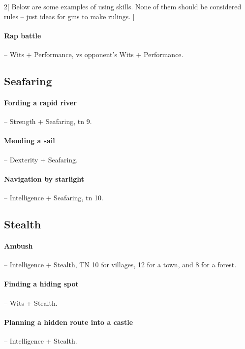 \begin{multicols}{2}[
  Below are some examples of using skills.
  None of them should be considered rules -- just ideas for \glspl{gm} to make rulings.
]
\paragraph{Rap battle} -- Wits + Performance, vs opponent's Wits + Performance.

\subsection{Seafaring}

\paragraph{Fording a rapid river} -- Strength + Seafaring, \gls{tn} 9.

\paragraph{Mending a sail} -- Dexterity + Seafaring.

\paragraph{Navigation by starlight} -- Intelligence + Seafaring, \gls{tn} 10.

\subsection{Stealth}

\paragraph{Ambush} -- Intelligence + Stealth, TN 10 for villages, 12 for a town, and 8 for a forest.

\paragraph{Finding a hiding spot} -- Wits + Stealth.

\paragraph{Planning a hidden route into a castle} -- Intelligence + Stealth.

\begin{figure*}[t]


\end{figure*}
\end{multicols}
